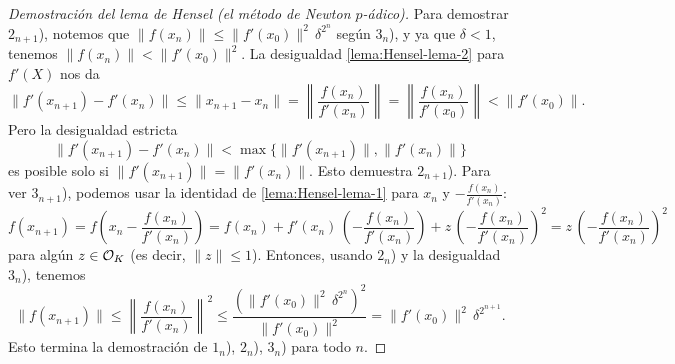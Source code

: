 \documentclass{article}
\numberwithin{equation}{section}
\theoremstyle{definition}
\begin{document}
\begin{proof}[Demostración del lema de Hensel (el método de Newton $p$-ádico)]
  Para demostrar $2_{n+1}$), notemos que
  $\|f (x_n)\| \le \|f' (x_0)\|^2 \, \delta^{2^n}$ según $3_n$), y ya que
  $\delta < 1$, tenemos $\|f (x_n)\| < \|f' (x_0)\|^2$. La desigualdad
  \ref{lema:Hensel-lema-2} para $f' (X)$ nos da
  \[ \|f' (x_{n+1}) - f' (x_n)\| \le
     \|x_{n+1} - x_n\| =
     \left\|\frac{f (x_n)}{f' (x_n)}\right\| =
     \left\|\frac{f (x_n)}{f' (x_0)}\right\| <
     \|f' (x_0)\|. \]
  Pero la desigualdad estricta
  $$\|f' (x_{n+1}) - f' (x_n)\| < \max \{ \|f' (x_{n+1})\|, \|f' (x_n)\| \}$$
  es posible solo si $\|f' (x_{n+1})\| = \|f' (x_n)\|$. Esto demuestra
  $2_{n+1}$). Para ver $3_{n+1}$), podemos usar la identidad de
  \ref{lema:Hensel-lema-1} para $x_n$ y $-\frac{f (x_n)}{f' (x_n)}$:
  \[ f (x_{n+1}) =
     f \left(x_n - \frac{f (x_n)}{f' (x_n)}\right) =
     f (x_n) + f' (x_n)\,\left(- \frac{f (x_n)}{f' (x_n)}\right) + z\,\left(-\frac{f (x_n)}{f' (x_n)}\right)^2 =
     z\,\left(- \frac{f (x_n)}{f' (x_n)}\right)^2 \]
  para algún $z\in \mathcal{O}_K$ (es decir, $\|z\| \le 1$). Entonces, usando $2_n$) y la
  desigualdad $3_n$), tenemos
  \[ \|f (x_{n+1})\| \le
     \left\|\frac{f (x_n)}{f' (x_n)}\right\|^2 \le
     \frac{(\|f' (x_0)\|^2\,\delta^{2^n})^2}{\|f' (x_0)\|^2} =
     \|f' (x_0)\|^2\,\delta^{2^{n+1}}. \]
  Esto termina la demostración de $1_n$), $2_n$), $3_n$) para todo $n$.
\end{proof}
\end{document}
